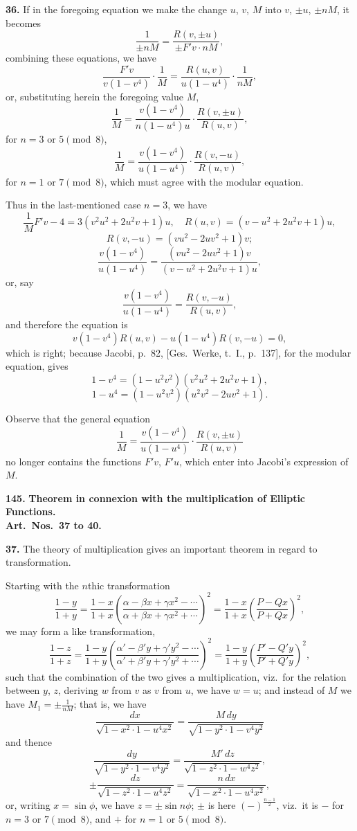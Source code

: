 \documentclass[11pt,a4paper]{book}
\begin{document}
\medskip
\noindent\textbf{36.} If in the foregoing equation we make the change $u$, $v$, $M$ into $v$, $\pm u$, $\pm nM$, it becomes
\[
\frac{1}{\pm nM} = \frac{R(v, \pm u)}{\pm F'v \cdot nM},
\]
combining these equations, we have
\[
\frac{F'v}{v(1 - v^4)} \cdot \frac{1}{M} = \frac{R(u, v)}{u(1 - u^4)} \cdot \frac{1}{nM},
\]
or, substituting herein the foregoing value $M$,
\[
\frac{1}{M} = \frac{v(1 - v^4)}{n(1 - u^4)u} \cdot \frac{R(v, \pm u)}{R(u, v)},
\]
for $n = 3$ or $5 \pmod{8}$,
\[
\frac{1}{M} = \frac{v(1 - v^4)}{u(1 - u^4)} \cdot \frac{R(v, -u)}{R(u, v)},
\]
for $n = 1$ or $7 \pmod{8}$, which must agree with the modular equation.

Thus in the last-mentioned case $n = 3$, we have
\[
\frac{1}{M}F'v - 4 = 3(v^2u^2 + 2u^2v + 1)u, \quad R(u, v) = (v - u^2 + 2u^2v + 1)u,
\]
\[
R(v, -u) = (vu^2 - 2uv^2 + 1)v;
\]
\[
\frac{v(1 - v^4)}{u(1 - u^4)} = \frac{(vu^2 - 2uv^2 + 1)v}{(v - u^2 + 2u^2v + 1)u},
\]
or, say
\[
\frac{v(1 - v^4)}{u(1 - u^4)} = \frac{R(v, -u)}{R(u, v)},
\]
and therefore the equation is
\[
v(1 - v^4)R(u, v) - u(1 - u^4)R(v, -u) = 0,
\]
which is right; because Jacobi, p.~82, [Ges.\ Werke, t.~I., p.~137], for the modular equation, gives
\[
1 - v^4 = (1 - u^2v^2)(v^2u^2 + 2u^2v + 1),
\]
\[
1 - u^4 = (1 - u^2v^2)(u^2v^2 - 2uv^2 + 1).
\]

Observe that the general equation
\[
\frac{1}{M} = \frac{v(1 - v^4)}{u(1 - u^4)} \cdot \frac{R(v, \pm u)}{R(u, v)}
\]
no longer contains the functions $F'v$, $F'u$, which enter into Jacobi's expression of $M$.


\noindent\textbf{145.} \textbf{Theorem in connexion with the multiplication of Elliptic Functions.}\\
\textbf{Art.~Nos.~37 to 40.}

\medskip
\noindent\textbf{37.} The theory of multiplication gives an important theorem in regard to transformation.

Starting with the $n$thic transformation
\[
\frac{1 - y}{1 + y} = \frac{1 - x}{1 + x}\left(\frac{\alpha - \beta x + \gamma x^2 - \cdots}{\alpha + \beta x + \gamma x^2 + \cdots}\right)^2 = \frac{1 - x}{1 + x}\left(\frac{P - Qx}{P + Qx}\right)^2,
\]
we may form a like transformation,
\[
\frac{1 - z}{1 + z} = \frac{1 - y}{1 + y}\left(\frac{\alpha' - \beta'y + \gamma'y^2 - \cdots}{\alpha' + \beta'y + \gamma'y^2 + \cdots}\right)^2 = \frac{1 - y}{1 + y}\left(\frac{P' - Q'y}{P' + Q'y}\right)^2,
\]
such that the combination of the two gives a multiplication, viz.\ for the relation between $y$, $z$, deriving $w$ from $v$ as $v$ from $u$, we have $w = u$; and instead of $M$ we have $M_1 = \pm\frac{1}{nM}$; that is, we have
\[
\frac{dx}{\sqrt{1 - x^2 \cdot 1 - u^4x^2}} = \frac{M\,dy}{\sqrt{1 - y^2 \cdot 1 - v^4y^2}}
\]
and thence
\[
\frac{dy}{\sqrt{1 - y^2 \cdot 1 - v^4y^2}} = \frac{M'\,dz}{\sqrt{1 - z^2 \cdot 1 - w^4z^2}},
\]
\[
\pm\frac{dz}{\sqrt{1 - z^2 \cdot 1 - u^4z^2}} = \frac{n\,dx}{\sqrt{1 - x^2 \cdot 1 - u^4x^2}},
\]
or, writing $x = \sin\phi$, we have $z = \pm\sin n\phi$; $\pm$ is here $(-)^{\frac{n-1}{2}}$, viz.\ it is $-$ for $n = 3$ or $7 \pmod{8}$, and $+$ for $n = 1$ or $5 \pmod{8}$.
\end{document}
